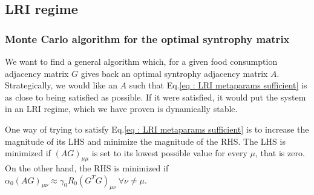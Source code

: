 \documentclass[12pt, titlepage]{report}
\begin{document}
\subsection{LRI regime}
\subsubsection{Monte Carlo algorithm for the optimal syntrophy matrix} \label{section : numerical analysis LRI MC solver}
We want to find a general algorithm which, for a given food consumption adjacency matrix $G$ gives back an optimal syntrophy adjacency matrix $A$. Strategically, we would like an $A$ such that Eq.\eqref{eq : LRI metaparams sufficient} is as close to being satisfied as possible. If it were satisfied, it would put the system in an LRI regime, which we have proven is dynamically stable.

One way of trying to satisfy Eq.\eqref{eq : LRI metaparams sufficient} is to increase the magnitude of its LHS and minimize the magnitude of the RHS. The LHS is minimized if $(AG)_{\mu\mu}$ is set to its lowest possible value for every $\mu$, that is zero. On the other hand, the RHS is minimized if $\alpha_0(AG)_{\mu\nu}\approx\gamma_0R_0 (G^TG)_{\mu\nu} \ \forall \nu\neq\mu$.
\end{document}
